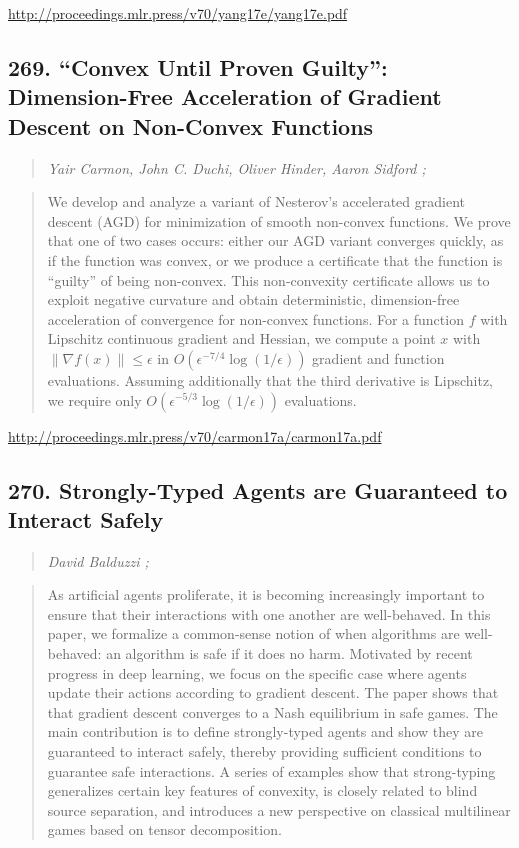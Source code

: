 \documentclass{article}
\begin{document}
\href{http://proceedings.mlr.press/v70/yang17e/yang17e.pdf}{http://proceedings.mlr.press/v70/yang17e/yang17e.pdf}

\subsection{269. “Convex Until Proven Guilty”: Dimension-Free Acceleration of Gradient Descent on Non-Convex Functions}

\begin{quote}
\footnotesize{\textit{Yair Carmon, John C. Duchi, Oliver Hinder, Aaron Sidford ;}}
\end{quote}

\begin{quote}
    We develop and analyze a variant of Nesterov’s accelerated gradient descent (AGD) for minimization of smooth non-convex functions. We prove that one of two cases occurs: either our AGD variant converges quickly, as if the function was convex, or we produce a certificate that the function is “guilty” of being non-convex. This non-convexity certificate allows us to exploit negative curvature and obtain deterministic, dimension-free acceleration of convergence for non-convex functions. For a function $f$ with Lipschitz continuous gradient and Hessian, we compute a point $x$ with $\|\nabla f(x)\| \le \epsilon$ in $O(\epsilon^{-7/4} \log(1/ \epsilon) )$ gradient and function evaluations. Assuming additionally that the third derivative is Lipschitz, we require only $O(\epsilon^{-5/3} \log(1/ \epsilon) )$ evaluations.  \end{quote}

\href{http://proceedings.mlr.press/v70/carmon17a/carmon17a.pdf}{http://proceedings.mlr.press/v70/carmon17a/carmon17a.pdf}

\subsection{270. Strongly-Typed Agents are Guaranteed to Interact Safely}

\begin{quote}
\footnotesize{\textit{David Balduzzi ;}}
\end{quote}

\begin{quote}
    As artificial agents proliferate, it is becoming increasingly important to ensure that their interactions with one another are well-behaved. In this paper, we formalize a common-sense notion of when algorithms are well-behaved: an algorithm is safe if it does no harm. Motivated by recent progress in deep learning, we focus on the specific case where agents update their actions according to gradient descent. The paper shows that that gradient descent converges to a Nash equilibrium in safe games. The main contribution is to define strongly-typed agents and show they are guaranteed to interact safely, thereby providing sufficient conditions to guarantee safe interactions. A series of examples show that strong-typing generalizes certain key features of convexity, is closely related to blind source separation, and introduces a new perspective on classical multilinear games based on tensor decomposition.  \end{quote}
\end{document}
